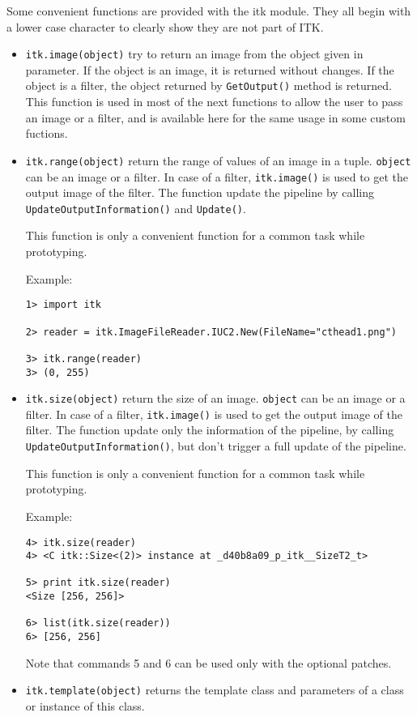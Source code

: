 \documentclass{InsightArticle}
\begin{document}
Some convenient functions are provided with the itk module. They all begin with a lower
case character to clearly show they are not part of ITK.
\begin{itemize}
  \item \verb$itk.image(object)$ try to return an image from the object given in
parameter. If the object is an image, it is returned without changes. If the object
is a filter, the object returned by \verb$GetOutput()$ method is returned.
This function is used in most of the next functions to allow the user to
pass an image or a filter, and is available here for the same usage in some custom
fuctions.

  \item \verb$itk.range(object)$ return the range of values of an image in a tuple.
\verb$object$ can be an image or a filter. In case of a filter, \verb$itk.image()$ is used
to get the output image of the filter. The function update the pipeline by calling
\verb$UpdateOutputInformation()$ and \verb$Update()$.

This function is only a convenient function for a common task while prototyping.

Example:
\begin{verbatim}
1> import itk

2> reader = itk.ImageFileReader.IUC2.New(FileName="cthead1.png")

3> itk.range(reader)
3> (0, 255)
\end{verbatim}


  \item \verb$itk.size(object)$ return the size of an image.
\verb$object$ can be an image or a filter. In case of a filter, \verb$itk.image()$ is used
to get the output image of the filter. The function update only the information of the
pipeline, by calling \verb$UpdateOutputInformation()$, but don't trigger a full update
of the pipeline.

This function is only a convenient function for a common task while prototyping.

Example:
\begin{verbatim}
4> itk.size(reader)
4> <C itk::Size<(2)> instance at _d40b8a09_p_itk__SizeT2_t>

5> print itk.size(reader)
<Size [256, 256]>

6> list(itk.size(reader))
6> [256, 256]
\end{verbatim}
Note that commands 5 and 6 can be used only with the optional patches.

  \item \verb$itk.template(object)$ returns the template class and parameters
of a class or instance of this class.


\end{itemize}
\end{document}
